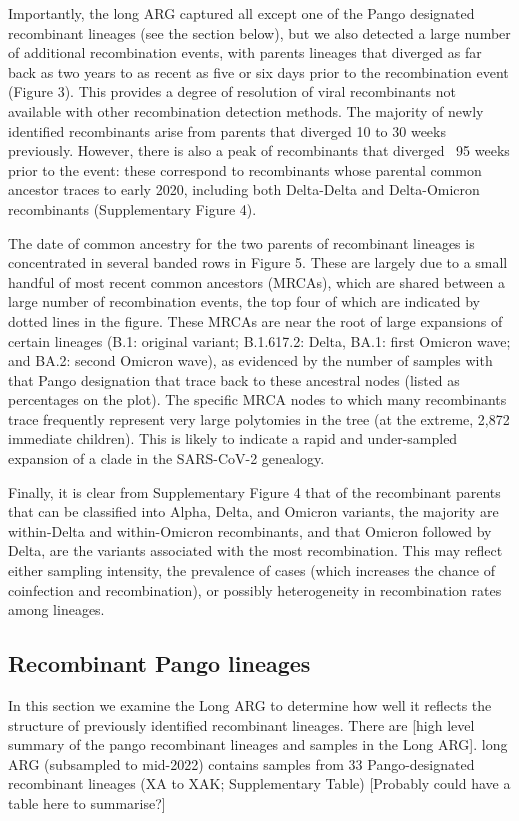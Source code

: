 \documentclass{article}
\begin{document}
Importantly, the long ARG captured all except one of the Pango designated
recombinant lineages (see the section below), but we also detected a large
number of additional recombination events, with parents lineages that diverged
as far back as two years to as recent as five or six days prior to the
recombination event (Figure 3). This provides a degree of resolution of viral
recombinants not available with other recombination detection methods. The
majority of newly identified recombinants arise from parents that diverged 10
to 30 weeks previously. However, there is also a peak of recombinants that
diverged ~95 weeks prior to the event: these correspond to recombinants whose
parental common ancestor traces to early 2020, including both Delta-Delta and
Delta-Omicron recombinants (Supplementary Figure 4).

The date of common ancestry for the two parents of recombinant lineages is
concentrated in several banded rows in Figure 5. These are largely due to a
small handful of most recent common ancestors (MRCAs), which are shared between
a large number of recombination events, the top four of which are indicated by
dotted lines in the figure. These MRCAs are near the root of large expansions
of certain lineages (B.1: original variant;  B.1.617.2: Delta, BA.1: first
Omicron wave; and BA.2: second Omicron wave), as evidenced by the number of
samples with that Pango designation that trace back to these ancestral nodes
(listed as percentages on the plot). The specific MRCA nodes to which many
recombinants trace frequently represent very large polytomies in the tree (at
the extreme, 2,872 immediate children). This is likely to indicate a rapid and
under-sampled expansion of a clade in the SARS-CoV-2 genealogy.

Finally, it is clear from Supplementary Figure 4 that of the recombinant
parents that can be classified into Alpha, Delta, and Omicron variants, the
majority are within-Delta and within-Omicron recombinants, and that Omicron
followed by Delta, are the variants associated with the most recombination.
This may reflect either sampling intensity, the prevalence of cases (which
increases the chance of coinfection and recombination), or possibly
heterogeneity in recombination rates among lineages.

\subsection{Recombinant Pango lineages}

In this section we examine the Long ARG to determine how well it reflects
the structure of previously identified recombinant lineages.
There are [high level summary of the pango recombinant lineages and samples
in the Long ARG].
long ARG (subsampled to mid-2022) contains samples
from 33 Pango-designated recombinant lineages (XA to XAK; Supplementary Table)
[Probably could have a table here to summarise?]
\end{document}
